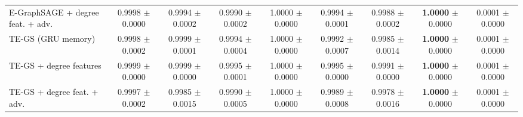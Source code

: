 \begin{table}[t]
\begin{tabular}{lcccccccc}
E-GraphSAGE + degree feat. + adv. & 0.9998 {\scriptsize $\pm$ 0.0000} & 0.9994 {\scriptsize $\pm$ 0.0002} & 0.9990 {\scriptsize $\pm$ 0.0002} & 1.0000 {\scriptsize $\pm$ 0.0000} & 0.9994 {\scriptsize $\pm$ 0.0001} & 0.9988 {\scriptsize $\pm$ 0.0002} & \textbf{1.0000} {\scriptsize $\pm$ 0.0000} & 0.0001 {\scriptsize $\pm$ 0.0000} \\
TE-GS (GRU memory) & 0.9998 {\scriptsize $\pm$ 0.0002} & 0.9999 {\scriptsize $\pm$ 0.0001} & 0.9994 {\scriptsize $\pm$ 0.0004} & 1.0000 {\scriptsize $\pm$ 0.0000} & 0.9992 {\scriptsize $\pm$ 0.0007} & 0.9985 {\scriptsize $\pm$ 0.0014} & \textbf{1.0000} {\scriptsize $\pm$ 0.0000} & 0.0001 {\scriptsize $\pm$ 0.0000} \\
TE-GS + degree features & 0.9999 {\scriptsize $\pm$ 0.0000} & 0.9999 {\scriptsize $\pm$ 0.0000} & 0.9995 {\scriptsize $\pm$ 0.0001} & 1.0000 {\scriptsize $\pm$ 0.0000} & 0.9995 {\scriptsize $\pm$ 0.0000} & 0.9991 {\scriptsize $\pm$ 0.0000} & \textbf{1.0000} {\scriptsize $\pm$ 0.0000} & 0.0001 {\scriptsize $\pm$ 0.0000} \\
TE-GS + degree feat. + adv. & 0.9997 {\scriptsize $\pm$ 0.0002} & 0.9985 {\scriptsize $\pm$ 0.0015} & 0.9990 {\scriptsize $\pm$ 0.0005} & 1.0000 {\scriptsize $\pm$ 0.0000} & 0.9989 {\scriptsize $\pm$ 0.0008} & 0.9978 {\scriptsize $\pm$ 0.0016} & \textbf{1.0000} {\scriptsize $\pm$ 0.0000} & 0.0001 {\scriptsize $\pm$ 0.0000} \\
\bottomrule
\end{tabular}
\end{table}